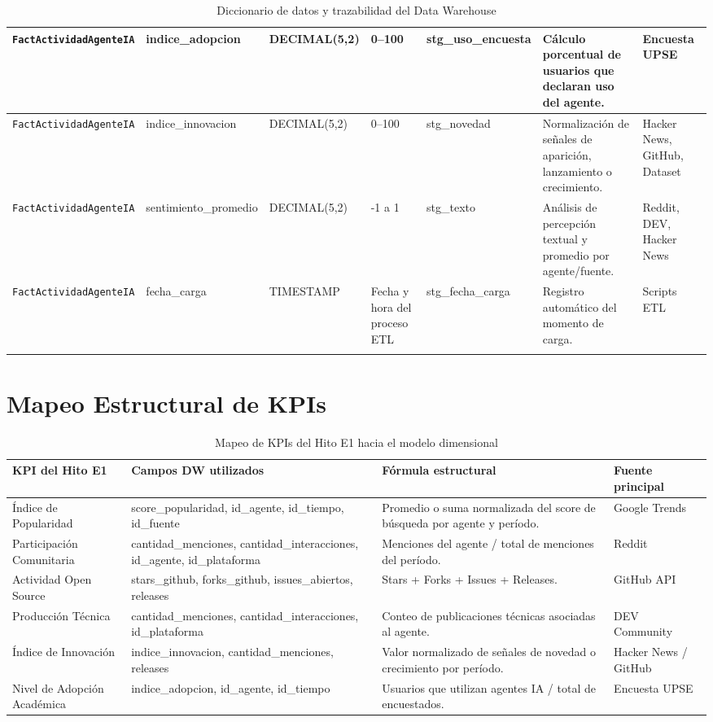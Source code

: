 \documentclass[12pt,a4paper]{article}
\newcommand{\FactTabla}{\texttt{FactActividadAgenteIA}}
\begin{document}
\begin{landscape}
\begin{longtable}{|P{3.55cm}|P{3.05cm}|P{2.35cm}|P{4.00cm}|P{3.95cm}|P{4.95cm}|P{3.05cm}|}
\FactTabla & indice\_adopcion & DECIMAL(5,2) & 0--100 & stg\_uso\_encuesta & Cálculo porcentual de usuarios que declaran uso del agente. & Encuesta UPSE \\ \hline
\FactTabla & indice\_innovacion & DECIMAL(5,2) & 0--100 & stg\_novedad & Normalización de señales de aparición, lanzamiento o crecimiento. & Hacker News, GitHub, Dataset \\ \hline
\FactTabla & sentimiento\_promedio & DECIMAL(5,2) & -1 a 1 & stg\_texto & Análisis de percepción textual y promedio por agente/fuente. & Reddit, DEV, Hacker News \\ \hline
\FactTabla & fecha\_carga & TIMESTAMP & Fecha y hora del proceso ETL & stg\_fecha\_carga & Registro automático del momento de carga. & Scripts ETL \\ \hline

\caption{Diccionario de datos y trazabilidad del Data Warehouse}
\end{longtable}
\endgroup
\end{landscape}
\restoregeometry

\section{Mapeo Estructural de KPIs}

\begin{table}[H]
\centering
\small
{}
\begin{tabular}{|P{3.6cm}|P{5.4cm}|P{4.5cm}|P{2.2cm}|}
\hline
{}
\textbf{KPI del Hito E1} & \textbf{Campos DW utilizados} & \textbf{Fórmula estructural} & \textbf{Fuente principal} \\ \hline
Índice de Popularidad & score\_popularidad, id\_agente, id\_tiempo, id\_fuente & Promedio o suma normalizada del score de búsqueda por agente y período. & Google Trends \\ \hline
Participación Comunitaria & cantidad\_menciones, cantidad\_interacciones, id\_agente, id\_plataforma & Menciones del agente / total de menciones del período. & Reddit \\ \hline
Actividad Open Source & stars\_github, forks\_github, issues\_abiertos, releases & Stars + Forks + Issues + Releases. & GitHub API \\ \hline
Producción Técnica & cantidad\_menciones, cantidad\_interacciones, id\_plataforma & Conteo de publicaciones técnicas asociadas al agente. & DEV Community \\ \hline
Índice de Innovación & indice\_innovacion, cantidad\_menciones, releases & Valor normalizado de señales de novedad o crecimiento por período. & Hacker News / GitHub \\ \hline
Nivel de Adopción Académica & indice\_adopcion, id\_agente, id\_tiempo & Usuarios que utilizan agentes IA / total de encuestados. & Encuesta UPSE \\ \hline
\end{tabular}
\caption{Mapeo de KPIs del Hito E1 hacia el modelo dimensional}
\end{table}

\end{document}
